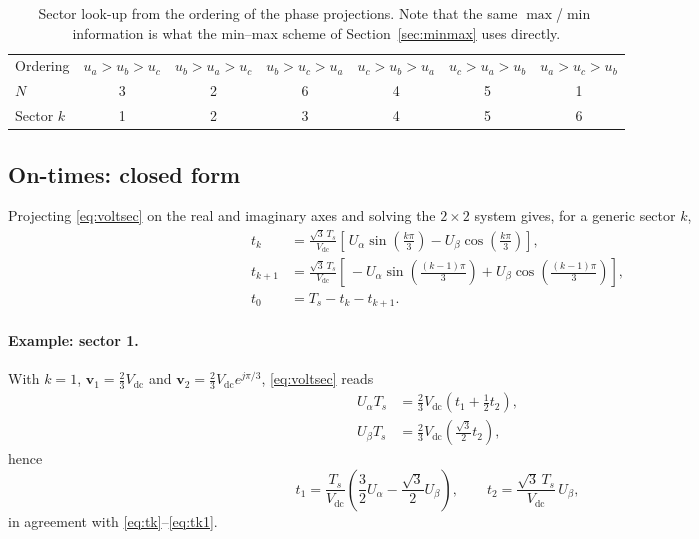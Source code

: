 \documentclass[11pt,a4paper]{article}
\newcommand{\vdc}{V_{\mathrm{dc}}}
\newcommand{\Ts}{T_{s}}
\newcommand{\ualpha}{U_{\alpha}}
\newcommand{\ubeta}{U_{\beta}}
\begin{document}
\begin{table}[h]
\centering
\footnotesize
\setlength{\tabcolsep}{4pt}
\begin{tabular}{lcccccc}
\toprule
Ordering & $u_a>u_b>u_c$ & $u_b>u_a>u_c$ & $u_b>u_c>u_a$ & $u_c>u_b>u_a$ & $u_c>u_a>u_b$ & $u_a>u_c>u_b$ \\
$N$ & 3 & 2 & 6 & 4 & 5 & 1 \\
Sector $k$ & 1 & 2 & 3 & 4 & 5 & 6 \\
\bottomrule
\end{tabular}
\caption{Sector look-up from the ordering of the phase projections. Note that the
same $\max$/$\min$ information is what the min--max scheme of
Section~\ref{sec:minmax} uses directly.}
\label{tab:sector}
\end{table}

\subsection{On-times: closed form}

Projecting \eqref{eq:voltsec} on the real and imaginary axes and solving the
$2\times 2$ system gives, for a generic sector $k$,
\begin{align}
t_k       &= \frac{\sqrt{3}\,\Ts}{\vdc}
             \left[\, \ualpha \sin\!\left(\frac{k\pi}{3}\right)
                     - \ubeta \cos\!\left(\frac{k\pi}{3}\right) \right], \label{eq:tk}\\[2mm]
t_{k+1}   &= \frac{\sqrt{3}\,\Ts}{\vdc}
             \left[\, -\ualpha \sin\!\left(\frac{(k-1)\pi}{3}\right)
                     + \ubeta \cos\!\left(\frac{(k-1)\pi}{3}\right) \right], \label{eq:tk1}\\[2mm]
t_0       &= \Ts - t_k - t_{k+1}.
\end{align}

\paragraph{Example: sector 1.} With $k=1$, $\bm{v}_1 = \tfrac{2}{3}\vdc$ and
$\bm{v}_2 = \tfrac{2}{3}\vdc e^{j\pi/3}$, \eqref{eq:voltsec} reads
\begin{align}
\ualpha \Ts &= \frac{2}{3}\vdc\left(t_1 + \frac{1}{2} t_2\right), \\
\ubeta  \Ts &= \frac{2}{3}\vdc\left(\frac{\sqrt{3}}{2} t_2\right),
\end{align}
hence
\begin{equation}
t_1 = \frac{\Ts}{\vdc}\left(\frac{3}{2}\ualpha - \frac{\sqrt{3}}{2}\ubeta\right),
\qquad
t_2 = \frac{\sqrt{3}\,\Ts}{\vdc}\,\ubeta ,
\end{equation}
in agreement with \eqref{eq:tk}--\eqref{eq:tk1}.
\end{document}
